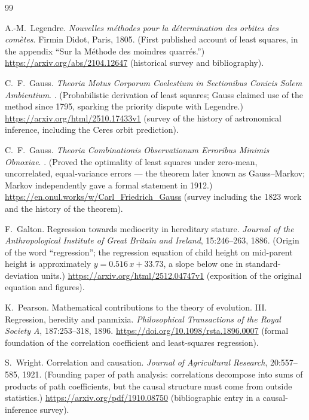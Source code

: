 \documentclass[11pt, a4paper]{article}
\theoremstyle{plain}
\theoremstyle{definition}
\theoremstyle{remark}
\begin{document}

\begin{thebibliography}{99}\small

A.-M.~Legendre.
\newblock \emph{Nouvelles m\'ethodes pour la d\'etermination des orbites des com\`etes}.
\newblock Firmin Didot, Paris, 1805. (First published account of least squares, in the appendix ``Sur la M\'ethode des moindres quarr\'es.'')
\newblock \url{https://arxiv.org/abs/2104.12647} (historical survey and bibliography).

C.~F.~Gauss.
\newblock \emph{Theoria Motus Corporum Coelestium in Sectionibus Conicis Solem Ambientium}.
. (Probabilistic derivation of least squares; Gauss claimed use of the method since 1795, sparking the priority dispute with Legendre.)
\newblock \url{https://arxiv.org/html/2510.17433v1} (survey of the history of astronomical inference, including the Ceres orbit prediction).

C.~F.~Gauss.
\newblock \emph{Theoria Combinationis Observationum Erroribus Minimis Obnoxiae}.
. (Proved the optimality of least squares under zero-mean, uncorrelated, equal-variance errors --- the theorem later known as Gauss--Markov; Markov independently gave a formal statement in 1912.)
\newblock \url{https://en.onul.works/w/Carl_Friedrich_Gauss} (survey including the 1823 work and the history of the theorem).

F.~Galton.
\newblock Regression towards mediocrity in hereditary stature.
\newblock \emph{Journal of the Anthropological Institute of Great Britain and Ireland}, 15:246--263, 1886. (Origin of the word ``regression''; the regression equation of child height on mid-parent height is approximately $y = 0.516\,x + 33.73$, a slope below one in standard-deviation units.)
\newblock \url{https://arxiv.org/html/2512.04747v1} (exposition of the original equation and figures).

K.~Pearson.
\newblock Mathematical contributions to the theory of evolution. III. Regression, heredity and panmixia.
\newblock \emph{Philosophical Transactions of the Royal Society A}, 187:253--318, 1896.
\newblock \url{https://doi.org/10.1098/rsta.1896.0007} (formal foundation of the correlation coefficient and least-squares regression).

S.~Wright.
\newblock Correlation and causation.
\newblock \emph{Journal of Agricultural Research}, 20:557--585, 1921. (Founding paper of path analysis: correlations decompose into sums of products of path coefficients, but the causal structure must come from outside statistics.)
\newblock \url{https://arxiv.org/pdf/1910.08750} (bibliographic entry in a causal-inference survey).


\end{thebibliography}
\end{document}
